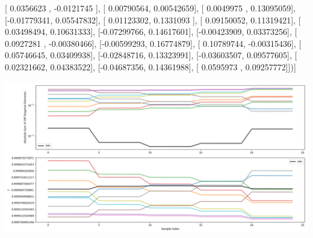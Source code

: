 \documentclass{article}
\begin{document}
       [ 0.0356623 , -0.0121745 ],
       [ 0.00790564,  0.00542659],
       [ 0.0049975 ,  0.13095059],
       [-0.01779341,  0.05547832],
       [ 0.01123302,  0.1331093 ],
       [ 0.09150052,  0.11319421],
       [ 0.03498494,  0.10631333],
       [-0.07299766,  0.14617601],
       [-0.00423909,  0.03373256],
       [ 0.0927281 , -0.00380466],
       [-0.00599293,  0.16774879],
       [ 0.10789744, -0.00315436],
       [ 0.05746645,  0.03409938],
       [-0.02848716,  0.13323991],
       [-0.03603507,  0.09577605],
       [ 0.02321662,  0.04383522],
       [-0.04687356,  0.14361988],
       [ 0.0595973 ,  0.09257772]])]
\begin{center}
\includegraphics[scale=.9]{report_pickled_controls181/control_dpn_all.png}

\end{center}
\end{document}
